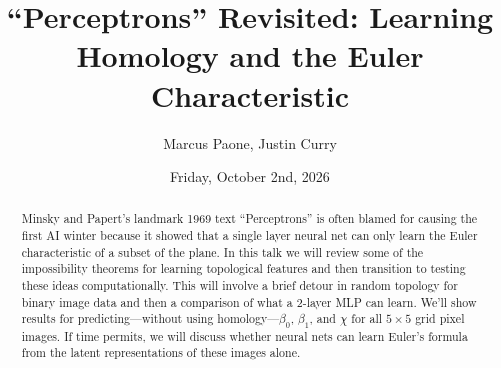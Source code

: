 \documentclass{UAmathtalk}
\author{Marcus Paone, Justin Curry}
\title{“Perceptrons” Revisited: Learning Homology and the Euler Characteristic
}
\date{Friday, October 2nd, 2026}
\begin{document}
\maketitle
\renewcommand*{\abstractsize}{\fontsize{13.5}{16.2}\selectfont}
\begin{abstract}
    {
        Minsky and Papert’s landmark 1969 text “Perceptrons” is often blamed for causing the first AI winter because it showed that a single layer neural net can only learn the Euler characteristic of a subset of the plane.
        In this talk we will review some of the impossibility theorems for learning topological features and then transition to testing these ideas computationally.
        This will involve a brief detour in random topology for binary image data and then a comparison of what a 2-layer MLP can learn.
        We’ll show results for predicting---without using homology---$\beta_0$, $\beta_1$, and $\chi$ for all $5\times 5$ grid pixel images.
        If time permits, we will discuss whether neural nets can learn Euler’s formula from the latent representations of these images alone.
    }
\end{abstract}
\end{document}
